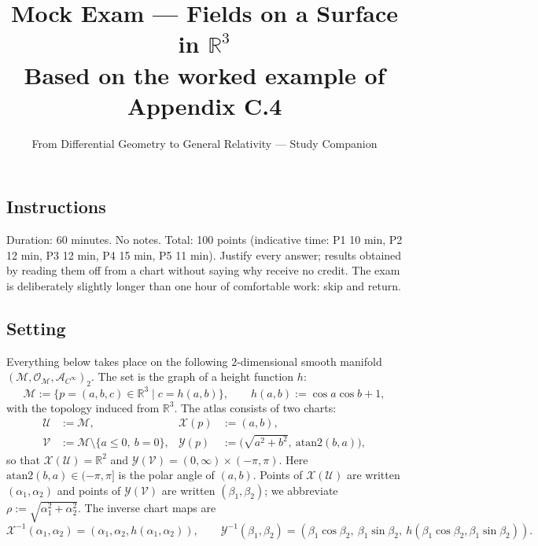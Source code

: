 \documentclass[11pt]{article}
\title{Mock Exam --- Fields on a Surface in $\mathbb R^3$\\ \large Based on the worked example of Appendix C.4}
\author{From Differential Geometry to General Relativity --- Study Companion}
\date{}
\begin{document}
\maketitle

\subsection*{Instructions}

\noindent Duration: 60 minutes. No notes. Total: 100 points (indicative time: P1 10 min, P2 12 min, P3 12 min, P4 15 min, P5 11 min).
Justify every answer; results obtained by reading them off from a chart without saying why receive no credit.
The exam is deliberately slightly longer than one hour of comfortable work: skip and return.

\subsection*{Setting}

Everything below takes place on the following $2$-dimensional smooth manifold $(\mathcal M,\mathcal O_{\mathcal M},\mathcal A_{C^\infty})_2$.
The set is the graph of a height function $h$:
\[
\mathcal M:=\{p=(a,b,c)\in\mathbb R^3\mid c=h(a,b)\},\qquad h(a,b):=\cos a\cos b+1,
\]
with the topology induced from $\mathbb R^3$. The atlas consists of two charts:
\begin{align*}
\mathcal U&:=\mathcal M,& \mathcal X(p)&:=(a,b),\\
\mathcal V&:=\mathcal M\setminus\{a\le 0,\ b=0\},& \mathcal Y(p)&:=\bigl(\sqrt{a^2+b^2},\ \mathrm{atan2}(b,a)\bigr),
\end{align*}
so that $\mathcal X(\mathcal U)=\mathbb R^2$ and $\mathcal Y(\mathcal V)=(0,\infty)\times(-\pi,\pi)$. Here $\mathrm{atan2}(b,a)\in(-\pi,\pi]$ is the polar angle of $(a,b)$.
Points of $\mathcal X(\mathcal U)$ are written $(\alpha_1,\alpha_2)$ and points of $\mathcal Y(\mathcal V)$ are written $(\beta_1,\beta_2)$; we abbreviate
$\rho:=\sqrt{\alpha_1^2+\alpha_2^2}$. The inverse chart maps are
\[
\mathcal X^{-1}(\alpha_1,\alpha_2)=(\alpha_1,\alpha_2,h(\alpha_1,\alpha_2)),\qquad
\mathcal Y^{-1}(\beta_1,\beta_2)=(\beta_1\cos\beta_2,\ \beta_1\sin\beta_2,\ h(\beta_1\cos\beta_2,\beta_1\sin\beta_2)).
\]
\end{document}
